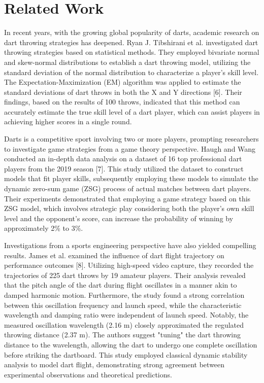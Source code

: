 \documentclass[cjjs]{ipart}
\theoremstyle{plain}
\begin{document}
\section{Related Work}
In recent years, with the growing global popularity of darts, academic research on dart throwing strategies has deepened. Ryan J. Tibshirani et al. investigated dart throwing strategies based on statistical methods. They employed bivariate normal and skew-normal distributions to establish a dart throwing model, utilizing the standard deviation of the normal distribution to characterize a player's skill level. The Expectation-Maximization (EM) algorithm was applied to estimate the standard deviations of dart throws in both the X and Y directions [6]. Their findings, based on the results of 100 throws, indicated that this method can accurately estimate the true skill level of a dart player, which can assist players in achieving higher scores in a single round.

Darts is a competitive sport involving two or more players, prompting researchers to investigate game strategies from a game theory perspective. Haugh and Wang conducted an in-depth data analysis on a dataset of 16 top professional dart players from the 2019 season [7]. This study utilized the dataset to construct models that fit player skills, subsequently employing these models to simulate the dynamic zero-sum game (ZSG) process of actual matches between dart players. Their experiments demonstrated that employing a game strategy based on this ZSG model, which involves strategic play considering both the player's own skill level and the opponent's score, can increase the probability of winning by approximately 2\% to 3\%.

Investigations from a sports engineering perspective have also yielded compelling results. James et al. examined the influence of dart flight trajectory on performance outcomes [8]. Utilizing high-speed video capture, they recorded the trajectories of 225 dart throws by 19 amateur players. Their analysis revealed that the pitch angle of the dart during flight oscillates in a manner akin to damped harmonic motion.  Furthermore, the study found a strong correlation between this oscillation frequency and launch speed, while the characteristic wavelength and damping ratio were independent of launch speed. Notably, the measured oscillation wavelength (2.16 m) closely approximated the regulated throwing distance (2.37 m). The authors suggest "tuning" the dart throwing distance to the wavelength, allowing the dart to undergo one complete oscillation before striking the dartboard. This study employed classical dynamic stability analysis to model dart flight, demonstrating strong agreement between experimental observations and theoretical predictions.
\end{document}
